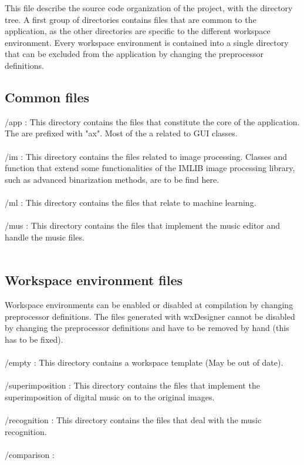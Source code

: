 \documentclass[]{article}
\begin{document}
This file describe the source code organization of the project, with the directory tree.
A first group of directories contains files that are common to the application, as the
other directories are specific to the different workspace environment. Every workspace
environment is contained into a single directory that can be excluded from the application
by changing the preprocessor definitions.\\

\subsection{Common files}

/app : This directory contains the files that constitute the core of the application.
The are prefixed with "ax". Most of the a related to GUI classes.\\\\
/im : This directory contains the files related to image processing. Classes and
function that extend some functionalities of the IMLIB image processing library,
such as advanced binarization methods, are to be find here.\\\\
/ml : This directory contains the files that relate to machine learning.\\\\
/mus : This directory contains the files that implement the music editor and handle the music files.\\\\

\subsection{Workspace environment files}

Workspace environments can be enabled or disabled at compilation by changing
preprocessor definitions. The files generated with wxDesigner cannot be disabled
by changing the preprocessor definitions and have to be removed by hand (this
has to be fixed).\\\\
/empty : This directory contains a workspace template (May be out of date).\\\\ 
/superimposition : This directory contains the files that implement the superimposition
of digital music on to the original images.\\\\
/recognition : This directory contains the files that deal with the music recognition.\\\\
/comparison :
\end{document}
